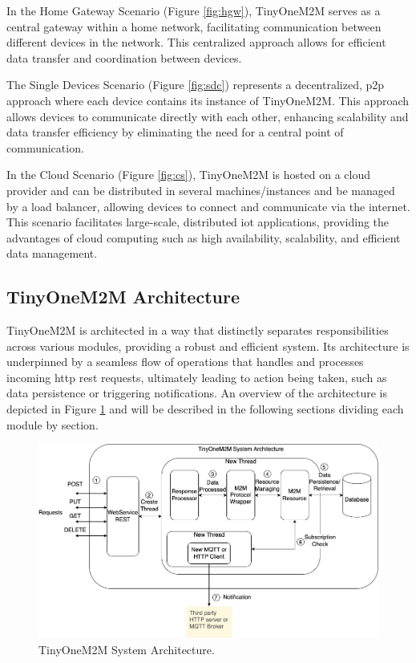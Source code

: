 \documentclass[a4paper,fleqn]{cas-dc}
\begin{document}
In the Home Gateway Scenario (Figure \ref{fig:hgw}), TinyOneM2M serves as a central gateway within a home network, facilitating communication between different devices in the network. This centralized approach allows for efficient data transfer and coordination between devices.

The Single Devices Scenario (Figure \ref{fig:sdc}) represents a decentralized, \gls{p2p} approach where each device contains its instance of TinyOneM2M. This approach allows devices to communicate directly with each other, enhancing scalability and data transfer efficiency by eliminating the need for a central point of communication.

In the Cloud Scenario (Figure \ref{fig:cs}), TinyOneM2M is hosted on a cloud provider and can be distributed in several machines/instances and be managed by a load balancer, allowing devices to connect and communicate via the internet. This scenario facilitates large-scale, distributed \gls{iot} applications, providing the advantages of cloud computing such as high availability, scalability, and efficient data management.

\subsection{TinyOneM2M Architecture}\label{tinyonem2marchitecture}

TinyOneM2M is architected in a way that distinctly separates responsibilities across various modules, providing a robust and efficient system. Its architecture is underpinned by a seamless flow of operations that handles and processes incoming \gls{http} \gls{rest} requests, ultimately leading to action being taken, such as data persistence or triggering notifications. An overview of the architecture is depicted in Figure \ref{fig:TinyOneM2Mchitecture} and will be described in the following sections dividing each module by section.

\begin{figure}[htbp]
	\centering
	\includegraphics[width=\linewidth]{SolutionArchitecture.jpg}
	\caption{TinyOneM2M System Architecture.}
	\label{fig:TinyOneM2Mchitecture}
\end{figure}
\end{document}
